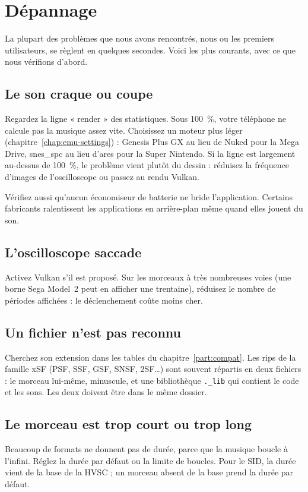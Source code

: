 \chapter{Dépannage}

La plupart des problèmes que nous avons rencontrés, nous ou les premiers utilisateurs, se règlent en quelques
secondes. Voici les plus courants, avec ce que nous vérifions d'abord.

\section{Le son craque ou coupe}
Regardez la ligne « render » des statistiques. Sous 100~\%, votre téléphone ne calcule pas la musique assez vite.
Choisissez un moteur plus léger (chapitre~\ref{chap:emu-settings}) : Genesis Plus GX au lieu de Nuked pour la Mega
Drive, snes\_spc au lieu d'ares pour la Super Nintendo. Si la ligne est largement au-dessus de 100~\%, le
problème vient plutôt du dessin : réduisez la fréquence d'images de l'oscilloscope ou passez au rendu Vulkan.

Vérifiez aussi qu'aucun économiseur de batterie ne bride l'application. Certains fabricants ralentissent les
applications en arrière-plan même quand elles jouent du son.

\section{L'oscilloscope saccade}
Activez Vulkan s'il est proposé. Sur les morceaux à très nombreuses voies (une borne Sega Model~2 peut en afficher
une trentaine), réduisez le nombre de périodes affichées : le déclenchement coûte moins cher.

\section{Un fichier n'est pas reconnu}
Cherchez son extension dans les tables du chapitre~\ref{part:compat}. Les rips de la famille xSF (PSF, SSF, GSF, SNSF,
2SF\dots) sont souvent répartis en deux fichiers : le morceau lui-même, minuscule, et une bibliothèque
\texttt{.\_lib} qui contient le code et les sons. Les deux doivent être dans le même dossier.

\section{Le morceau est trop court ou trop long}
Beaucoup de formats ne donnent pas de durée, parce que la musique boucle à l'infini. Réglez la durée par défaut ou la
limite de boucles. Pour le SID, la durée vient de la base de la HVSC ; un morceau absent de la base prend la durée
par défaut.

